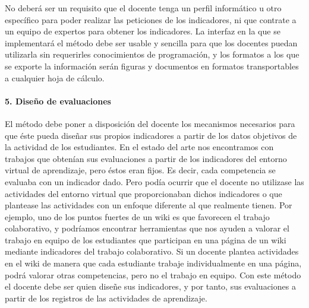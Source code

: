 No deberá ser un requisito que el docente tenga un perfil informático u otro específico para poder realizar las peticiones de los indicadores, ni que contrate a un equipo de expertos para obtener los indicadores. La interfaz en la que se implementará el método debe ser usable y sencilla para que los docentes puedan utilizarla sin requerirles conocimientos de programación, y los formatos a los que se exporte la información serán figuras y documentos en formatos transportables a cualquier hoja de cálculo.

\paragraph*{5. Diseño de evaluaciones}

El método debe poner a disposición del docente los mecanismos necesarios para que éste pueda diseñar sus propios indicadores a partir de los datos objetivos de la actividad de los estudiantes. En el estado del arte nos encontramos con trabajos que obtenían sus evaluaciones a partir de los indicadores del entorno virtual de aprendizaje, pero éstos eran fijos. Es decir, cada competencia se evaluaba con un indicador dado. Pero podía ocurrir que el docente no utilizase las actividades del entorno virtual que proporcionaban dichos indicadores o que plantease las actividades con un enfoque diferente al que realmente tienen. Por ejemplo, uno de los puntos fuertes de un wiki es que favorecen el trabajo colaborativo, y podríamos encontrar herramientas que nos ayuden a valorar el trabajo en equipo de los estudiantes que participan en una página de un wiki mediante indicadores del trabajo colaborativo. Si un docente plantea actividades en el wiki de manera que cada estudiante trabaje individualmente en una página, podrá valorar otras competencias, pero no el trabajo en equipo. Con este método el docente debe ser quien diseñe sus indicadores, y por tanto, sus evaluaciones a partir de los registros de las actividades de aprendizaje.



